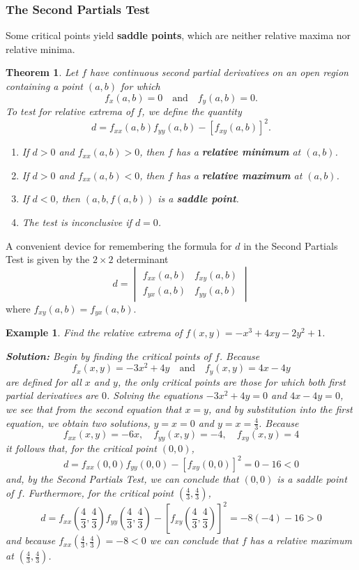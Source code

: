 \documentclass[titlepage,a4paper,12pt]{report}
\newtheorem{example}{Example}[section]
\newtheorem{theorem}{Theorem}[section]
\begin{document}
\subsubsection{The Second Partials Test}
Some critical points yield \textbf{saddle points}, which are neither relative maxima nor relative minima.
\begin{theorem}
Let $f$ have continuous second partial derivatives on an open region containing a point $(a,b)$ for which 
\[f_x(a,b)=0 \quad \mbox{and} \quad f_y(a,b)=0.\]
To test for relative extrema of $f$, we define the quantity 
\[d=f_{xx}(a,b)f_{yy}(a,b)-[f_{xy}(a,b)]^2.\]
\begin{enumerate}
\item If $d>0$ and $f_{xx}(a,b)>0$, then $f$ has a \textbf{relative minimum} at $(a,b)$.
\item If $d>0$ and $f_{xx}(a,b)<0$, then $f$ has a \textbf{relative maximum} at $(a,b)$.
\item If $d<0$, then $(a,b,f(a,b))$ is a \textbf{saddle point}.
\item The test is inconclusive if $d=0$.
\end{enumerate}
\end{theorem}
A convenient  device for remembering the formula for $d$ in the Second Partials Test is given by the $2\times 2$ determinant 
\[ d=
\begin{vmatrix}
f_{xx}(a,b) & f_{xy}(a,b) \\
f_{yx}(a,b) & f_{yy}(a,b)
\end{vmatrix} \] where $f_{xy}(a,b)=f_{yx}(a,b)$.
\begin{example}
Find the relative extrema of $f(x,y)=-x^3+4xy-2y^2+1$.

\noindent \textbf{Solution:} Begin by finding the critical points of $f$. Because 
\[f_x(x,y)=-3x^2+4y \quad \mbox{and} \quad f_y(x,y)=4x-4y\] are defined for all $x$ and $y$, the only critical points are those for which both first partial derivatives are $0$. Solving the equations $-3x^2+4y=0$ and $4x-4y=0$, we see that from the second equation that $x=y$, and by substitution into the first equation, we obtain two solutions, $y=x=0$ and $y=x=\frac{4}{3}$. Because 
\[f_{xx}(x,y)=-6x, \quad f_{yy}(x,y)=-4, \quad f_{xy}(x,y)=4\] it follows that, for the critical point $(0,0)$, 
\[d=f_{xx}(0,0)f_{yy}(0,0)-[f_{xy}(0,0)]^2=0-16<0\] and, by the Second Partials Test, we can conclude that $(0,0)$ is a saddle point of $f$. Furthermore, for the critical point $(\frac{4}{3},\frac{4}{3})$, 
\[d=f_{xx}\left(\frac{4}{3}, \frac{4}{3}\right)f_{yy}\left(\frac{4}{3}, \frac{4}{3}\right)-\left[f_{xy}\left(\frac{4}{3}, \frac{4}{3}\right)\right]^2=-8(-4)-16>0\] and because $f_{xx}(\frac{4}{3}, \frac{4}{3})=-8<0$ we can conclude that $f$ has a relative maximum at $(\frac{4}{3}, \frac{4}{3})$. 
\end{example}
\end{document}
